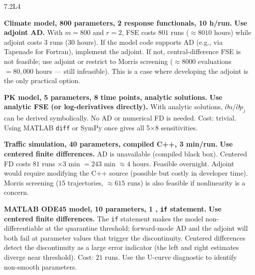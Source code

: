 \begin{solution}{7.2}{L4}

\solanswer

 \textbf{Climate model, 800 parameters, 2 response functionals, 10 h/run.}
\textbf{Use adjoint AD.} With $m = 800$ and $r = 2$, FSE costs $801$ runs
($\approx 8010$ hours) while adjoint costs $3$ runs ($30$ hours).
If the model code supports AD (e.g., via Tapenade for Fortran),
implement the adjoint. If not, central-difference FSE is not feasible;
use adjoint or restrict to Morris screening ($\approx 8000$ evaluations
$= 80{,}000$ hours — still infeasible). This is a case where
developing the adjoint is the only practical option.

 \textbf{PK model, 5 parameters, 8 time points, analytic solutions.}
\textbf{Use analytic FSE (or log-derivatives directly).}
With analytic solutions, $\partial u/\partial p_j$ can be derived
symbolically. No AD or numerical FD is needed. Cost: trivial.
Using MATLAB \texttt{diff} or SymPy once gives all 5$\times$8 sensitivities.

 \textbf{Traffic simulation, 40 parameters, compiled C++, 3 min/run.}
\textbf{Use centered finite differences.}
AD is unavailable (compiled black box). Centered FD costs $81$ runs
$\times3$ min $= 243$ min $\approx 4$ hours. Feasible overnight.
Adjoint would require modifying the C++ source (possible but costly in developer time).
Morris screening ($15$ trajectories, $\approx 615$ runs) is also feasible
if nonlinearity is a concern.

 \textbf{MATLAB ODE45 model, 10 parameters, 1 \QOI, \texttt{if} statement.}
\textbf{Use centered finite differences.}
The \texttt{if} statement makes the model non-differentiable at the quarantine
threshold; forward-mode AD and the adjoint will both fail at parameter values
that trigger the discontinuity. Centered differences detect the discontinuity
as a large error indicator (the left and right estimates diverge near threshold).
Cost: $21$ runs. Use the U-curve diagnostic to identify non-smooth parameters.


\end{solution}

